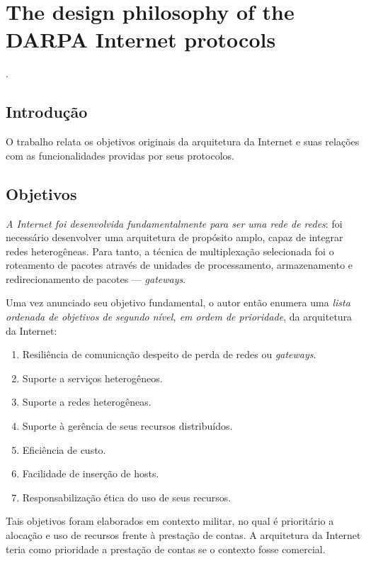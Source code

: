 
\chapter{The design philosophy of the DARPA Internet protocols}
 \cite{clark1988design}.


\section*{Introdução}

O trabalho relata os objetivos originais da arquitetura da Internet e suas relações com as funcionalidades providas por seus protocolos.


\section*{Objetivos}

\emph{A Internet foi desenvolvida fundamentalmente para ser uma rede de redes}: foi necessário desenvolver uma arquitetura de propósito amplo, capaz de integrar redes heterogêneas. Para tanto, a técnica de multiplexação selecionada foi o roteamento de pacotes através de unidades de processamento, armazenamento e redirecionamento de pacotes --- \emph{gateways}.

Uma vez anunciado seu objetivo fundamental, o autor então enumera uma \emph{lista ordenada de objetivos de segundo nível, em ordem de prioridade}, da arquitetura da Internet:

\vspace{-15pt}
\begin{enumerate}
  \item Resiliência de comunicação despeito de perda de redes ou \textit{gateways}.
  \item Suporte a serviços heterogêneos.
  \item Suporte a redes heterogêneas.
  \item Suporte à gerência de seus recursos distribuídos.
  \item Eficiência de custo.
  \item Facilidade de inserção de hosts.
  \item Responsabilização ética do uso de seus recursos.
\end{enumerate}

Tais objetivos foram elaborados em contexto militar, no qual é prioritário a alocação e uso de recursos frente à prestação de contas. A arquitetura da Internet teria como prioridade a prestação de contas se o contexto fosse comercial.


